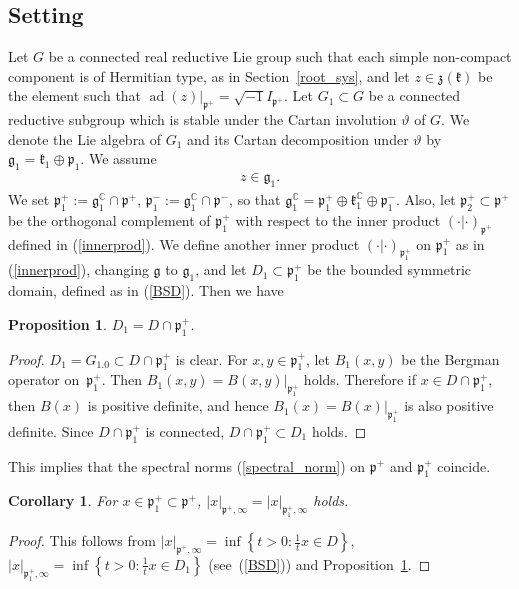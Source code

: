 \documentclass[pdftex]{sigma}
\numberwithin{equation}{section}
\newtheorem{Corollary}[Theorem]{Corollary}
\newtheorem{Proposition}[Theorem]{Proposition}
{ \theoremstyle{definition}
\newtheorem{Definition}[Theorem]{Definition}
\newtheorem{Note}[Theorem]{Note}
\newtheorem{Example}[Theorem]{Example}
\newtheorem{Remark}[Theorem]{Remark} }
\newcommand{\BC}{\mathbb{C}}
\newcommand{\fg}{\mathfrak{g}}
\newcommand{\fk}{\mathfrak{k}}
\newcommand{\fp}{\mathfrak{p}}
\newcommand{\fz}{\mathfrak{z}}
\begin{document}
\subsection{Setting}
Let $G$ be a connected real reductive Lie group such that each simple non-compact component is of Hermitian type, as in Section~\ref{root_sys},
and let $z\in\fz(\fk)$ be the element such that $\operatorname{ad}(z)|_{\fp^+}=\sqrt{-1}I_{\fp^+}$.
Let $G_1\subset G$ be a connected reductive subgroup which is stable under the Cartan involution $\vartheta$ of $G$.
We denote the Lie algebra of $G_1$ and its Cartan decomposition under $\vartheta$ by $\fg_1=\fk_1\oplus \fp_1$. We assume
\begin{gather}\label{assumption}
z\in \fg_1.
\end{gather}
We set $\fp_1^+:=\fg_1^\BC\cap \fp^+$, $\fp_1^-:=\fg_1^\BC\cap \fp^-$, so that
$\fg_1^\BC=\fp^+_1\oplus \fk^\BC_1\oplus \fp^-_1$.
Also, let $\fp_2^+\subset\fp^+$ be the orthogonal complement of $\fp^+_1$ with respect to the inner product $(\cdot|\cdot)_{\fp^+}$
defined in (\ref{innerprod}).
We define another inner product $(\cdot|\cdot)_{\fp^+_1}$ on $\fp^+_1$ as in (\ref{innerprod}), changing $\fg$ to $\fg_1$,
and let $D_1\subset\fp^+_1$ be the bounded symmetric domain, defined as in (\ref{BSD}). Then we have
\begin{Proposition}\label{BSD_intersection}
$D_1=D\cap \fp^+_1$.
\end{Proposition}
\begin{proof}$D_1=G_1.0\subset D\cap\fp^+_1$ is clear. For $x,y\in \fp^+_1$, let $B_1(x,y)$ be the Bergman operator on~$\fp^+_1$.
Then $B_1(x,y)=B(x,y)|_{\fp^+_1}$ holds. Therefore if $x\in D\cap \fp^+_1$, then $B(x)$ is positive definite,
and hence $B_1(x)=B(x)|_{\fp^+_1}$ is also positive definite. Since $D\cap \fp^+_1$ is connected, $D\cap\fp^+_1\subset D_1$ holds.
\end{proof}

This implies that the spectral norms (\ref{spectral_norm}) on $\fp^+$ and $\fp^+_1$ coincide.
\begin{Corollary}
For $x\in\fp^+_1\subset\fp^+$, $|x|_{\fp^+,\infty}=|x|_{\fp^+_1,\infty}$ holds.
\end{Corollary}
\begin{proof}This follows from $|x|_{\fp^+,\infty}=\inf\left\{t>0\colon \frac{1}{t}x\in D\right\}$,
$|x|_{\fp^+_1,\infty}=\inf\left\{t>0\colon \frac{1}{t}x\in D_1\right\}$ \linebreak (see~(\ref{BSD})) and Proposition~\ref{BSD_intersection}.
\end{proof}
\end{document}
